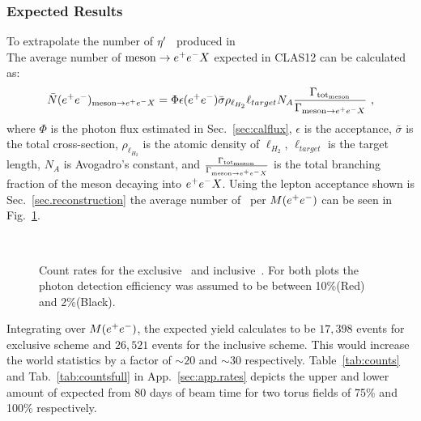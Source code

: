 \subsubsection{Expected Results}
To extrapolate the number of $\eta^{\prime}$ \ produced in 
\\
The average number of $\mathrm{meson} \to e^+e^- X$ expected in CLAS12 can be calculated as:
\begin{align}
\bar{N}(e^+e^-)_{\mathrm{meson}  \to e^+e^- X} = \Phi \epsilon(e^+e^-)\bar{\sigma} \rho_{\ell_{H_2}}\ell_{target}N_A \frac{\Gamma_{\mathrm{tot}_\mathrm{meson} }}{\Gamma_{\mathrm{meson}  \to e^+e^- X}}\ ,
\end{align}
where $\Phi$ is the photon flux estimated in Sec.~\ref{sec:calflux}, $\epsilon$ is the acceptance, $\bar{\sigma}$ is the total cross-section, $\rho_{\ell_{H_2}}$ is the atomic density of $\ell_{H_2}$, $\ell_{target}$ is the target length, $N_A$ is Avogadro's constant, and $\frac{\Gamma_{\mathrm{tot}_\mathrm{meson}}}{\Gamma_{\mathrm{meson} \to e^+e^- X}}$ is the total branching fraction of the meson decaying into $e^+e^- X$.
Using the lepton acceptance shown is Sec.~\ref{sec.reconstruction} the average number of \etaTP \  per $M(e^+e^-)$ can be seen in Fig.~\ref{fig:etayield}.
 \begin{figure}[h!]\begin{center}
\\
\caption[Counts rates for \etaTP]{\label{fig:etayield}Count rates for the exclusive~ and inclusive~. For both plots the photon detection efficiency was assumed to be between 10\%(Red) and  2\%(Black). }
\end{center}\end{figure}
\FloatBarrier
Integrating over $M(e^+e^-)$, the expected yield calculates to be $17,398$ events for exclusive scheme and $26,521$ events for the inclusive scheme. This would increase the world statistics by a factor of $\sim 20$ and $\sim 30$ respectively. 
Table~\ref{tab:counts} and Tab.~\ref{tab:countsfull} in App.~\ref{sec:app.rates} depicts the upper and lower amount of \epemT expected from 80 days of beam time for two torus fields of 75\% and 100\% respectively.
